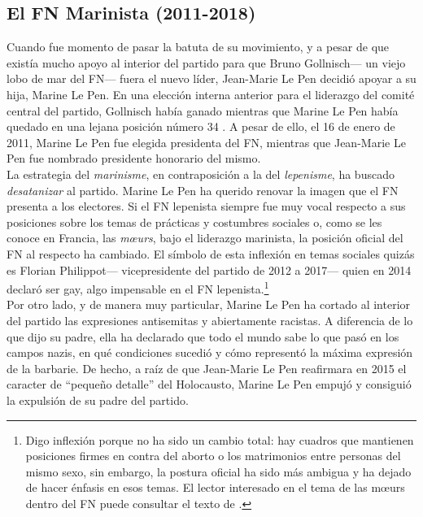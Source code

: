\subsection{El FN Marinista (2011-2018)} 
 
Cuando fue momento de pasar la batuta de su movimiento, y a pesar de que existía mucho apoyo al interior del partido para que Bruno Gollnisch--- un viejo lobo de mar del FN--- fuera el nuevo líder, Jean-Marie Le Pen decidió apoyar a su hija, Marine Le Pen. En una elección interna anterior para el liderazgo del comité central del partido, Gollnisch había ganado mientras que Marine Le Pen había quedado en una lejana posición número 34 \parencite{Williams12}. A pesar de ello, el 16 de enero de 2011, Marine Le Pen fue elegida presidenta del FN, mientras que Jean-Marie Le Pen fue nombrado presidente honorario del mismo.\\ 

La estrategia del \textit{marinisme}, en contraposición a la del \textit{lepenisme}, ha buscado \textit{desatanizar} al partido. Marine Le Pen ha querido renovar la imagen que el FN presenta a los electores. Si el FN lepenista siempre fue muy vocal respecto a sus posiciones sobre los temas de prácticas y costumbres sociales o, como se les conoce en Francia, las \textit{m\oe{}urs}, bajo el liderazgo marinista, la posición oficial del FN al respecto ha cambiado. El símbolo de esta inflexión en temas sociales quizás es Florian Philippot--- vicepresidente del partido de 2012 a 2017--- quien en 2014 declaró ser gay, algo impensable en el FN lepenista.\footnote{Digo inflexión porque no ha sido un cambio total: hay cuadros que mantienen posiciones firmes en contra del aborto o los matrimonios entre personas del mismo sexo, sin embargo, la postura oficial ha sido más ambigua y ha dejado de hacer énfasis en esos temas. El lector interesado en el tema de las m\oe{}urs dentro del FN puede consultar el texto de \textcite{Crepon15}.}\\ 

Por otro lado, y de manera muy particular, Marine Le Pen ha cortado al interior del partido las expresiones antisemitas y abiertamente racistas. A diferencia de lo que dijo su padre, ella ha declarado que todo el mundo sabe lo que pasó en los campos nazis, en qué condiciones sucedió y cómo representó la máxima expresión de la barbarie. De hecho, a raíz de que Jean-Marie Le Pen reafirmara en 2015 el caracter de ``pequeño detalle'' del Holocausto, Marine Le Pen empujó y consiguió la expulsión de su padre del partido.\\

